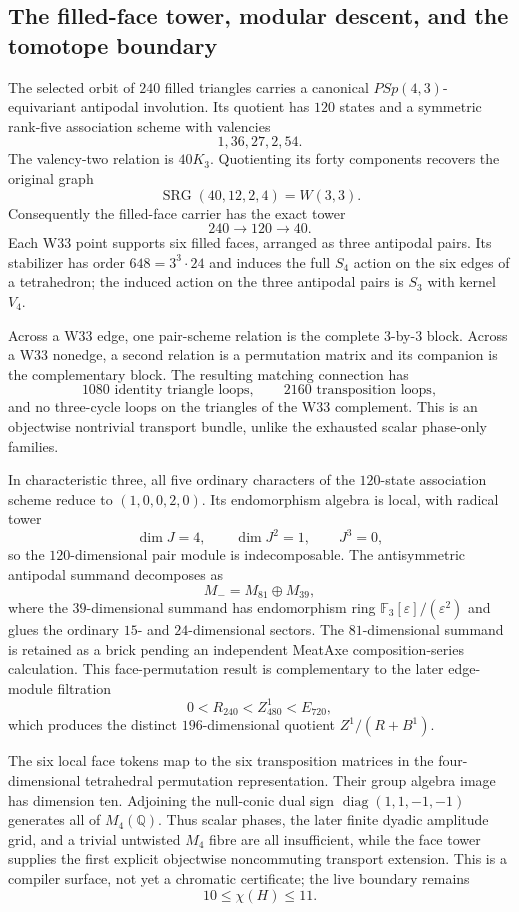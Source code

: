 \subsection{The filled-face tower, modular descent, and the tomotope boundary}
\label{sec:bt3458-3471-face-tower}

The selected orbit of $240$ filled triangles carries a canonical
$PSp(4,3)$-equivariant antipodal involution. Its quotient has $120$
states and a symmetric rank-five association scheme with valencies
\[
1,36,27,2,54.
\]
The valency-two relation is $40K_3$. Quotienting its forty components
recovers the original graph
\[
\operatorname{SRG}(40,12,2,4)=W(3,3).
\]
Consequently the filled-face carrier has the exact tower
\[
\boxed{240\longrightarrow120\longrightarrow40}.
\]
Each W33 point supports six filled faces, arranged as three antipodal
pairs. Its stabilizer has order $648=3^3\cdot24$ and induces the full
$S_4$ action on the six edges of a tetrahedron; the induced action on
the three antipodal pairs is $S_3$ with kernel $V_4$.

Across a W33 edge, one pair-scheme relation is the complete $3$-by-$3$
block. Across a W33 nonedge, a second relation is a permutation matrix
and its companion is the complementary block. The resulting matching
connection has
\[
1080\text{ identity triangle loops},\qquad
2160\text{ transposition loops},
\]
and no three-cycle loops on the triangles of the W33 complement. This
is an objectwise nontrivial transport bundle, unlike the exhausted
scalar phase-only families.

In characteristic three, all five ordinary characters of the
$120$-state association scheme reduce to $(1,0,0,2,0)$. Its
endomorphism algebra is local, with radical tower
\[
\dim J=4,\qquad \dim J^2=1,\qquad J^3=0,
\]
so the $120$-dimensional pair module is indecomposable. The
antisymmetric antipodal summand decomposes as
\[
M_-=M_{81}\oplus M_{39},
\]
where the $39$-dimensional summand has endomorphism ring
$\mathbb F_3[\varepsilon]/(\varepsilon^2)$ and glues the ordinary
$15$- and $24$-dimensional sectors. The $81$-dimensional summand is
retained as a brick pending an independent MeatAxe composition-series
calculation. This face-permutation result is complementary to the later
edge-module filtration
\[
0<R_{240}<Z^1_{480}<E_{720},
\]
which produces the distinct $196$-dimensional quotient
$Z^1/(R+B^1)$.

The six local face tokens map to the six transposition matrices in the
four-dimensional tetrahedral permutation representation. Their group
algebra image has dimension ten. Adjoining the null-conic dual sign
$\operatorname{diag}(1,1,-1,-1)$ generates all of $M_4(\mathbb Q)$.
Thus scalar phases, the later finite dyadic amplitude grid, and a trivial
untwisted $M_4$ fibre are all insufficient, while the face tower supplies
the first explicit objectwise noncommuting transport extension. This is
a compiler surface, not yet a chromatic certificate; the live boundary
remains
\[
10\leq\chi(H)\leq11.
\]

